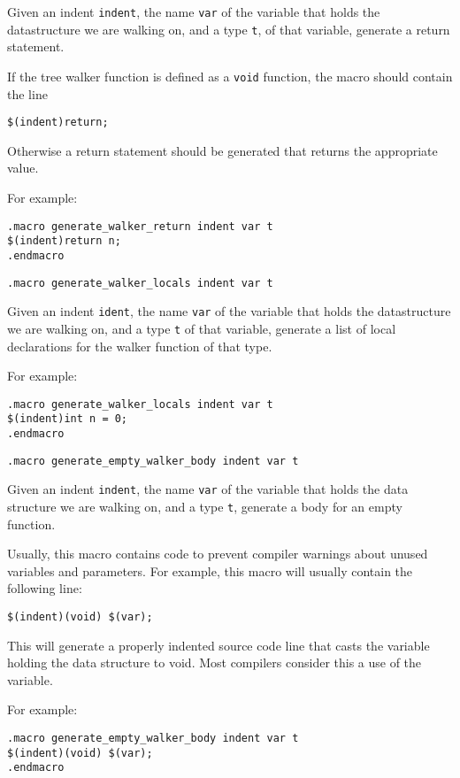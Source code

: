 \begin{desc}
Given an indent \verb'indent', the name \verb'var' of the variable that holds
the datastructure we are walking on, and a type \verb't', of that variable,
generate a return statement.
\par
If the tree walker function is defined as a \verb'void' function, the
macro should contain the line
\begin{verbatim}
$(indent)return;
\end{verbatim}
Otherwise a return statement should be generated that returns the
appropriate value.
\par
For example:
\begin{verbatim}
.macro generate_walker_return indent var t
$(indent)return n;
.endmacro
\end{verbatim}
\end{desc}
\begin{verbatim}
.macro generate_walker_locals indent var t
\end{verbatim}
\begin{desc}
Given an indent \verb'ident', the name \verb'var' of the variable
that holds the datastructure we are walking on, and a type \verb't'
of that variable, generate a list of local
declarations for the walker function of that type.
\par
For example:
\begin{verbatim}
.macro generate_walker_locals indent var t
$(indent)int n = 0;
.endmacro
\end{verbatim}
\end{desc}
\begin{verbatim}
.macro generate_empty_walker_body indent var t
\end{verbatim}
\begin{desc}
Given an indent \verb'indent', the name \verb'var' of the variable
that holds the data structure we are walking on, and a type \verb't',
generate a body for an empty function.

Usually, this macro contains code to prevent compiler warnings
about unused variables and parameters.
For example, this macro will usually contain the following line:
\begin{verbatim}
$(indent)(void) $(var);
\end{verbatim}
This will generate a properly indented source code line that casts the
variable holding the data structure to void. Most compilers consider
this a use of the variable.
\par
For example:
\begin{verbatim}
.macro generate_empty_walker_body indent var t
$(indent)(void) $(var);
.endmacro
\end{verbatim}
\end{desc}

